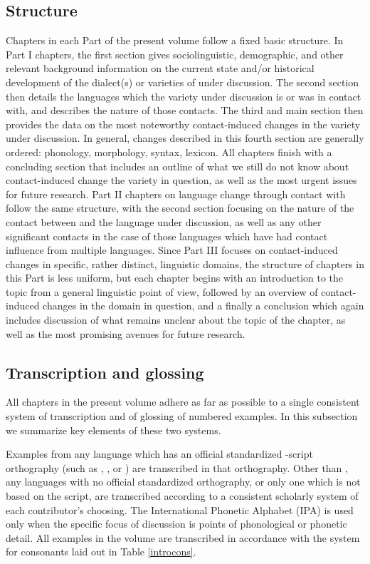 \documentclass[output=paper]{langsci/langscibook}
\begin{document}
\subsection{Structure}
Chapters in each Part of the present volume follow a fixed basic structure. In Part I chapters, the first section gives sociolinguistic, demographic, and other relevant background information on the current state and/or historical development of the dialect(s) or varieties of  under discussion. The second section then details the languages which the variety under discussion is or was in contact with, and describes the nature of those contacts. The third and main section then provides the data on the most noteworthy contact-induced changes in the variety under discussion. In general, changes described in this fourth section are generally ordered: phonology, morphology, syntax, lexicon. All chapters finish with a concluding section that includes an outline of what we still do not know about contact-induced change the variety in question, as well as the most urgent issues for {future} research. Part II chapters on {language change} through contact with  follow the same structure, with the second section {focusing} on the nature of the contact between  and the language under discussion, as well as any other significant contacts in the case of those languages which have had contact influence from multiple languages. Since Part III focuses on contact-induced changes in specific, rather distinct, linguistic domains, the structure of chapters in this Part is less uniform, but each chapter begins with an introduction to the topic from a general linguistic point of view, followed by an overview of contact-induced changes in the domain in question, and a finally a conclusion which again includes discussion of what remains unclear about the topic of the chapter, as well as the most promising avenues for {future} research.

\subsection{Transcription and glossing}

All chapters in the present volume adhere as far as possible to a single consistent system of transcription and of glossing of numbered examples. In this subsection we summarize key elements of these two systems.


Examples from any language which has an official standardized -script {orthography} (such as , , or ) are transcribed in that {orthography}. Other than , any languages with no official standardized {orthography}, or only one which is not based on the  script, are transcribed according to a consistent scholarly system of each contributor's choosing. The International Phonetic Alphabet (IPA) is used only when the specific focus of discussion is points of phonological or phonetic detail. All  examples in the volume are transcribed in accordance with the system for consonants laid out in Table \ref{introcons}.
\end{document}
